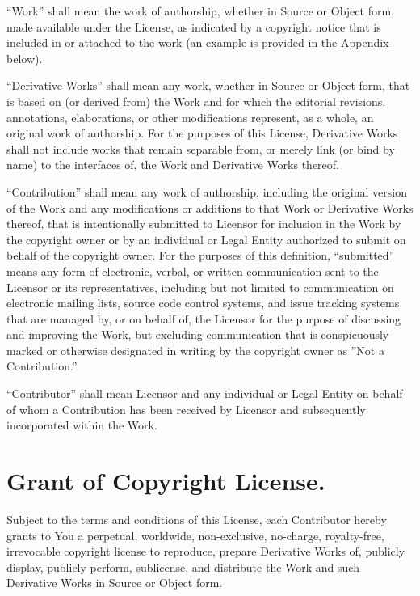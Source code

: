 \documentclass[a4paper, 12pt]{article}
\begin{document}
\vspace{0.3cm}

``Work'' shall mean the work of authorship, whether in Source or Object form, made available under the License, as indicated by a copyright notice that is included in or attached to the work (an example is provided in the Appendix below).

\vspace{0.3cm}

``Derivative Works'' shall mean any work, whether in Source or Object form, that is based on (or derived from) the Work and for which the editorial revisions, annotations, elaborations, or other modifications represent, as a whole, an original work of authorship. For the purposes of this License, Derivative Works shall not include works that remain separable from, or merely link (or bind by name) to the interfaces of, the Work and Derivative Works thereof.

\vspace{0.3cm}

``Contribution'' shall mean any work of authorship, including the original version of the Work and any modifications or additions to that Work or Derivative Works thereof, that is intentionally submitted to Licensor for inclusion in the Work by the copyright owner or by an individual or Legal Entity authorized to submit on behalf of the copyright owner. For the purposes of this definition, ``submitted'' means any form of electronic, verbal, or written communication sent to the Licensor or its representatives, including but not limited to communication on electronic mailing lists, source code control systems, and issue tracking systems that are managed by, or on behalf of, the Licensor for the purpose of discussing and improving the Work, but excluding communication that is conspicuously marked or otherwise designated in writing by the copyright owner as ''Not a Contribution.''

\vspace{0.3cm}

``Contributor'' shall mean Licensor and any individual or Legal Entity on behalf of whom a Contribution has been received by Licensor and subsequently incorporated within the Work.

\section{Grant of Copyright License.}

Subject to the terms and conditions of this License, each Contributor hereby grants to You a perpetual, worldwide, non-exclusive, no-charge, royalty-free, irrevocable copyright license to reproduce, prepare Derivative Works of, publicly display, publicly perform, sublicense, and distribute the Work and such Derivative Works in Source or Object form.
\end{document}
